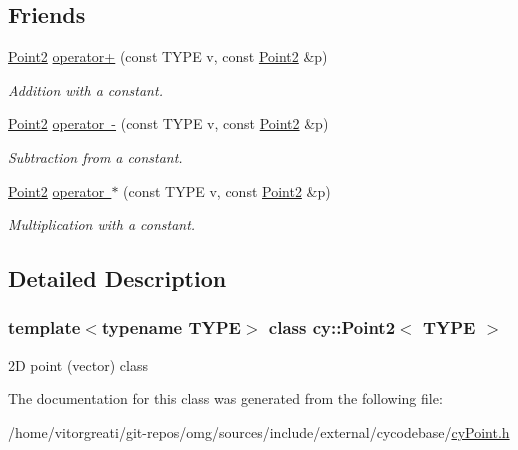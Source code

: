 \subsection*{Friends}
\begin{DoxyCompactItemize}
\item 
\mbox{\label{classcy_1_1_point2_a6cb41737f8a52dfa5d66ea3cdef58939}} 
\mbox{\hyperlink{classcy_1_1_point2}{Point2}} \mbox{\hyperlink{classcy_1_1_point2_a6cb41737f8a52dfa5d66ea3cdef58939}{operator+}} (const T\+Y\+PE v, const \mbox{\hyperlink{classcy_1_1_point2}{Point2}} \&p)
\begin{DoxyCompactList}\small\item\em Addition with a constant. \end{DoxyCompactList}\item 
\mbox{\label{classcy_1_1_point2_ab1766dc6f45087ce129fb8c2c064744c}} 
\mbox{\hyperlink{classcy_1_1_point2}{Point2}} \mbox{\hyperlink{classcy_1_1_point2_ab1766dc6f45087ce129fb8c2c064744c}{operator -\/}} (const T\+Y\+PE v, const \mbox{\hyperlink{classcy_1_1_point2}{Point2}} \&p)
\begin{DoxyCompactList}\small\item\em Subtraction from a constant. \end{DoxyCompactList}\item 
\mbox{\label{classcy_1_1_point2_af09cdf413736b93a3f52edd1d0482bf7}} 
\mbox{\hyperlink{classcy_1_1_point2}{Point2}} \mbox{\hyperlink{classcy_1_1_point2_af09cdf413736b93a3f52edd1d0482bf7}{operator $\ast$}} (const T\+Y\+PE v, const \mbox{\hyperlink{classcy_1_1_point2}{Point2}} \&p)
\begin{DoxyCompactList}\small\item\em Multiplication with a constant. \end{DoxyCompactList}\end{DoxyCompactItemize}


\subsection{Detailed Description}
\subsubsection*{template$<$typename T\+Y\+PE$>$\newline
class cy\+::\+Point2$<$ T\+Y\+P\+E $>$}

2D point (vector) class 

The documentation for this class was generated from the following file\+:\begin{DoxyCompactItemize}
\item 
/home/vitorgreati/git-\/repos/omg/sources/include/external/cycodebase/\mbox{\hyperlink{cy_point_8h}{cy\+Point.\+h}}\end{DoxyCompactItemize}
